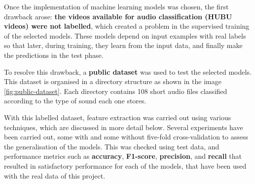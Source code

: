 Once the implementation of machine learning models was chosen, the first drawback arose: \textbf{the videos available for audio classification (HUBU videos) were not labelled}, which created a problem in the supervised training of the selected models. These models depend on input examples with real labels so that later, during training, they learn from the input data, and finally make the predictions in the test phase. 

To resolve this drawback, a \textbf{public dataset} was used to test the selected models. This dataset is organised in a directory structure as shown in the image \ref{fig:public-dataset}. Each directory contains 108 short audio files classified according to the type of sound each one stores.

With this labelled dataset, feature extraction was carried out using various techniques, which are discussed in more detail below. Several experiments have been carried out, some with and some without five-fold cross-validation to assess the generalisation of the models. This was checked using test data, and performance metrics such as \textbf{accuracy}, \textbf{F1-score}, \textbf{precision}, and \textbf{recall} that resulted in satisfactory performance for each of the models, that have been used with the real data of this project.
